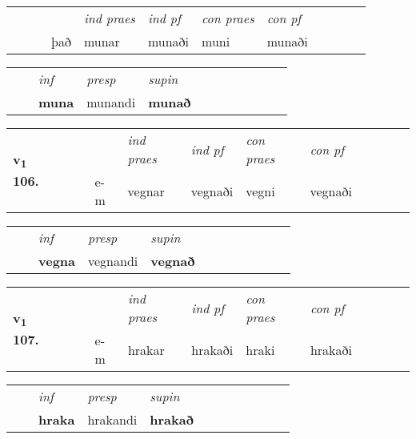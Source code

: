 \begin{tabular}{llllllllllll}
 & &  & &  \textit{ind praes} & \textit{ind pf} & \textit{con praes} & \textit{con pf} \\*
&  & & það & munar & munaði & muni & munaði \\*
\cmidrule{5-9}
\end{tabular}


\begin{tabular}{llllllllllll}
 & & \textit{inf}     & \textit{presp} & \textit{supin}       \\*
  & & \textbf{muna}      & munandi &  \textbf{munað}   \\*
\cmidrule{1-12}
\end{tabular}





\begin{tabular}{llllllllllll}\toprule
\multirow{4}{*}{{{\textbf{v{\textsubscript{1}}} \Large{\textbf{106.}}}}}  & &  & &  \textit{ind praes} & \textit{ind pf} & \textit{con praes} & \textit{con pf} \\*
&  & & e-m & vegnar & vegnaði & vegni & vegnaði \\*
\cmidrule{5-9}
\end{tabular}


\begin{tabular}{llllllllllll}
 & & \textit{inf}     & \textit{presp} & \textit{supin}       \\*
  & & \textbf{vegna}      & vegnandi &  \textbf{vegnað}   \\*
\cmidrule{1-12}
\end{tabular}





\begin{tabular}{llllllllllll}\toprule
\multirow{4}{*}{{{\textbf{v{\textsubscript{1}}} \Large{\textbf{107.}}}}}  & &  & &  \textit{ind praes} & \textit{ind pf} & \textit{con praes} & \textit{con pf} \\*
&  & & e-m & hrakar & hrakaði & hraki & hrakaði \\*
\cmidrule{5-9}
\end{tabular}


\begin{tabular}{llllllllllll}
 & & \textit{inf}     & \textit{presp} & \textit{supin}       \\*
  & & \textbf{hraka}      & hrakandi &  \textbf{hrakað}   \\*
\cmidrule{1-12}
\end{tabular}





